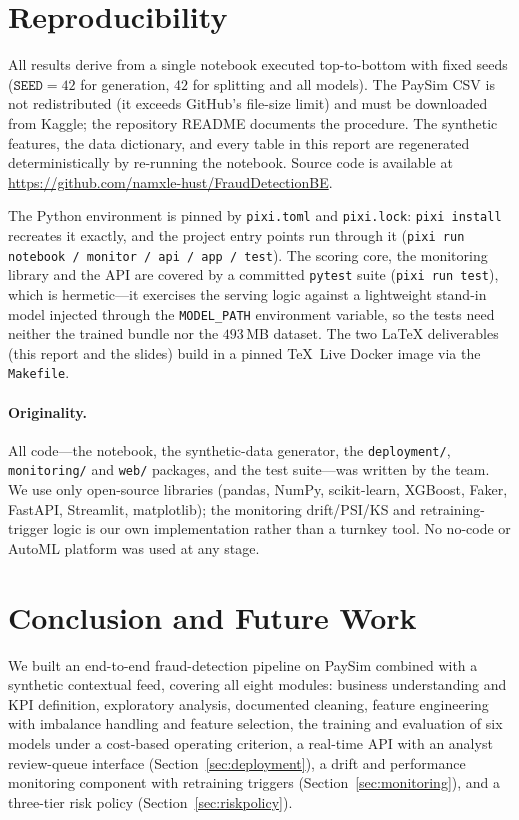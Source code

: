 \documentclass{article}
\begin{document}
\section{Reproducibility}
\label{sec:repro}

All results derive from a single notebook executed top-to-bottom with
fixed seeds ($\texttt{SEED} = 42$ for generation, $42$ for splitting
and all models). The PaySim CSV is not redistributed (it exceeds
GitHub's file-size limit) and must be downloaded from Kaggle; the
repository README documents the procedure. The synthetic features, the
data dictionary, and every table in this report are regenerated
deterministically by re-running the notebook. Source code is available
at \url{https://github.com/namxle-hust/FraudDetectionBE}.

The Python environment is pinned by \texttt{pixi.toml} and
\texttt{pixi.lock}: \texttt{pixi install} recreates it exactly, and the
project entry points run through it (\texttt{pixi run
notebook\,/\,monitor\,/\,api\,/\,app\,/\,test}). The scoring core, the
monitoring library and the API are covered by a committed \texttt{pytest}
suite (\texttt{pixi run test}), which is hermetic---it exercises the
serving logic against a lightweight stand-in model injected through the
\texttt{MODEL\_PATH} environment variable, so the tests need neither the
trained bundle nor the $493$\,MB dataset. The two \LaTeX{} deliverables
(this report and the slides) build in a pinned TeX~Live Docker image via
the \texttt{Makefile}.

\paragraph{Originality.} All code---the notebook, the synthetic-data
generator, the \texttt{deployment/}, \texttt{monitoring/} and
\texttt{web/} packages, and the test suite---was written by the team.
We use only open-source libraries (pandas, NumPy, scikit-learn, XGBoost,
Faker, FastAPI, Streamlit, matplotlib); the monitoring drift/PSI/KS and
retraining-trigger logic is our own implementation rather than a
turnkey tool. No no-code or AutoML platform was used at any stage.

\section{Conclusion and Future Work}
\label{sec:conclusion}

We built an end-to-end fraud-detection pipeline on PaySim combined with
a synthetic contextual feed, covering all eight modules: business
understanding and KPI definition, exploratory analysis, documented
cleaning, feature engineering with imbalance handling and feature
selection, the training and evaluation of six models under a
cost-based operating criterion, a real-time API with an analyst
review-queue interface (Section~\ref{sec:deployment}), a drift and
performance monitoring component with retraining triggers
(Section~\ref{sec:monitoring}), and a three-tier risk policy
(Section~\ref{sec:riskpolicy}).
\end{document}
